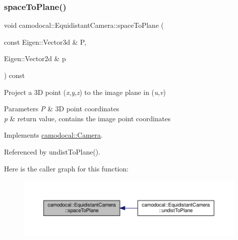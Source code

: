 \subsubsection{\texorpdfstring{space\+To\+Plane()}{spaceToPlane()}\hspace{0.1cm}{\footnotesize\ttfamily [1/2]}}
{\footnotesize\ttfamily void camodocal\+::\+Equidistant\+Camera\+::space\+To\+Plane (\begin{DoxyParamCaption}\item[{const Eigen\+::\+Vector3d \&}]{P,  }\item[{Eigen\+::\+Vector2d \&}]{p }\end{DoxyParamCaption}) const\hspace{0.3cm}{\ttfamily [virtual]}}



Project a 3D point ({\itshape x},{\itshape y},{\itshape z}) to the image plane in ({\itshape u},{\itshape v}) 


\begin{DoxyParams}{Parameters}
{\em P} & 3D point coordinates \\
\hline
{\em p} & return value, contains the image point coordinates \\
\hline
\end{DoxyParams}


Implements \hyperlink{classcamodocal_1_1Camera_acf49bd1ef0919e0faf89d060dc497b52}{camodocal\+::\+Camera}.



Referenced by undist\+To\+Plane().

Here is the caller graph for this function\+:\nopagebreak
\begin{figure}[H]
\begin{center}
\leavevmode
\includegraphics[width=350pt]{classcamodocal_1_1EquidistantCamera_a04de4daf1568c2425eabdbade499f927_icgraph}
\end{center}
\end{figure}
\mbox{\label{classcamodocal_1_1EquidistantCamera_af24c481afa7e454a687fcdc7726d443f}} 
